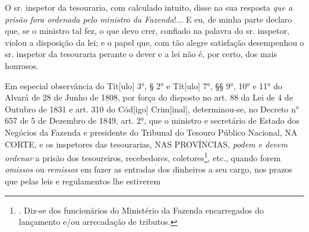 O sr. inspetor da tesouraria, com calculado intuito, disse na sua
resposta \emph{que a prisão fora ordenada pelo ministro da Fazenda}!...
E eu, de minha parte declaro que, se o ministro tal fez, o que devo
crer, confiado na palavra do sr. inspetor, violou a disposição da lei; e
o papel que, com tão alegre satisfação desempenhou o sr. inspetor da
tesouraria perante o dever e a lei não é, por certo, dos mais honrosos.

Em especial observância do Tít{[}ulo{]} 3°, § 2° e Tít{[}ulo{]} 7°, §§
9°, 10° e 11° do Alvará de 28 de Junho de 1808, por força do disposto no
art. 88 da Lei de 4 de Outubro de 1831 e art. 310 do Cód{[}igo{]}
Crim{[}inal{]}, determinou-se, no Decreto n° 657 de 5 de Dezembro de
1849, art. 2°, que o ministro e secretário de Estado dos Negócios da
Fazenda e presidente do Tribunal do Tesouro Público Nacional, NA CORTE,
e os inspetores das tesourarias, NAS PROVÍNCIAS, \emph{podem e devem
ordenar} a prisão dos tesoureiros, recebedores, coletores\footnote{.
  Diz-se dos funcionários do Ministério da Fazenda encarregados do
  lançamento e/ou arrecadação de tributos.}, etc., quando forem
\emph{omissos} ou \emph{remissos} em fazer as entradas dos dinheiros a
seu cargo, nos prazos que pelas leis e regulamentos lhe estiverem
